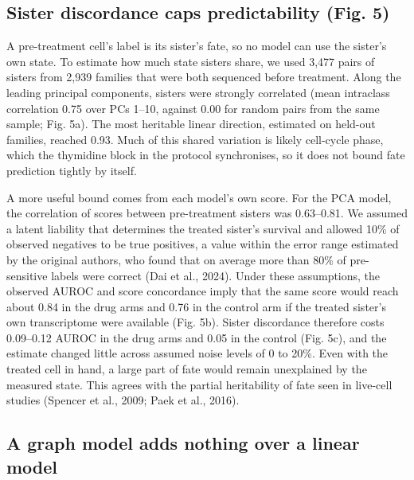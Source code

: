 \documentclass[11pt,a4paper]{article}
\begin{document}
\subsection*{Sister discordance caps predictability (Fig. 5)}

A pre-treatment cell's label is its sister's fate, so no model can use the sister's own state. To estimate how much state sisters share, we used 3,477 pairs of sisters from 2,939 families that were both sequenced before treatment. Along the leading principal components, sisters were strongly correlated (mean intraclass correlation 0.75 over PCs 1--10, against 0.00 for random pairs from the same sample; Fig. 5a). The most heritable linear direction, estimated on held-out families, reached 0.93. Much of this shared variation is likely cell-cycle phase, which the thymidine block in the protocol synchronises, so it does not bound fate prediction tightly by itself.

A more useful bound comes from each model's own score. For the PCA model, the correlation of scores between pre-treatment sisters was 0.63--0.81. We assumed a latent liability that determines the treated sister's survival and allowed 10\% of observed negatives to be true positives, a value within the error range estimated by the original authors, who found that on average more than 80\% of pre-sensitive labels were correct (Dai et al., 2024). Under these assumptions, the observed AUROC and score concordance imply that the same score would reach about 0.84 in the drug arms and 0.76 in the control arm if the treated sister's own transcriptome were available (Fig. 5b). Sister discordance therefore costs 0.09--0.12 AUROC in the drug arms and 0.05 in the control (Fig. 5c), and the estimate changed little across assumed noise levels of 0 to 20\%. Even with the treated cell in hand, a large part of fate would remain unexplained by the measured state. This agrees with the partial heritability of fate seen in live-cell studies (Spencer et al., 2009; Paek et al., 2016).

\subsection*{A graph model adds nothing over a linear model}
\end{document}
